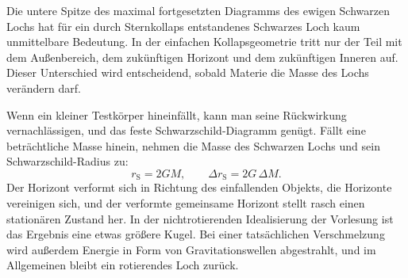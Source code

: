 Die untere Spitze des maximal fortgesetzten Diagramms des ewigen Schwarzen Lochs hat für ein durch Sternkollaps entstandenes Schwarzes Loch kaum unmittelbare Bedeutung. In der einfachen Kollapsgeometrie tritt nur der Teil mit dem Außenbereich, dem zukünftigen Horizont und dem zukünftigen Inneren auf. Dieser Unterschied wird entscheidend, sobald Materie die Masse des Lochs verändern darf.

\begin{classroomqa}
\end{classroomqa}

Wenn ein kleiner Testkörper hineinfällt, kann man seine Rückwirkung vernachlässigen, und das feste Schwarzschild-Diagramm genügt. Fällt eine beträchtliche Masse hinein, nehmen die Masse des Schwarzen Lochs und sein Schwarzschild-Radius zu:
\begin{equation}
r_{\mathrm S}=2GM,
\qquad
\Delta r_{\mathrm S}=2G\,\Delta M.
\label{eq:l7-growing-radius}
\end{equation}
Der Horizont verformt sich in Richtung des einfallenden Objekts, die Horizonte vereinigen sich, und der verformte gemeinsame Horizont stellt rasch einen stationären Zustand her. In der nichtrotierenden Idealisierung der Vorlesung ist das Ergebnis eine etwas größere Kugel. Bei einer tatsächlichen Verschmelzung wird außerdem Energie in Form von Gravitationswellen abgestrahlt, und im Allgemeinen bleibt ein rotierendes Loch zurück.

\begin{classroomqa}
\end{classroomqa}

